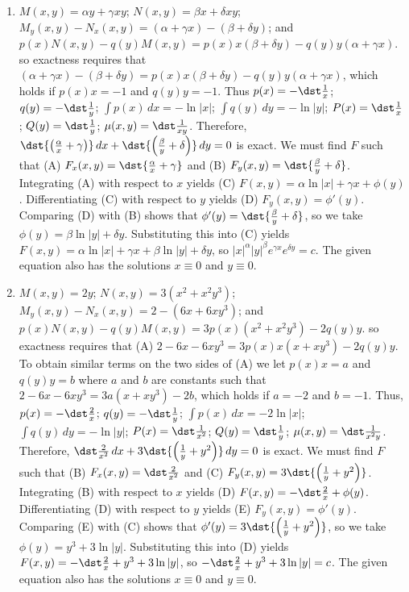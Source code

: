 \documentclass[openany]{book}
\newenvironment{sectionSolutions}{
 \begin{enumerate}[item-label={\thesection.\arabic{enumi}.}]
}{
 \end{enumerate}
}
\begin{document}
\begin{sectionSolutions}
\item
$M(x,y)=\alpha y+\gamma xy$;\;
$N(x,y)=\beta x+ \delta xy$;\;
 $M_y(x,y)-N_x(x,y)=(\alpha+\gamma x)-(\beta+\delta y)$;
and  $p(x)N(x,y)-q(y)M(x,y)=p(x)x(\beta + \delta y)-
q(y)y(\alpha +\gamma x)$.
so exactness requires that
 $(\alpha+\gamma x)-(\beta+\delta y)=
p(x)x(\beta+\delta y)-
q(y)y(\alpha+\gamma x)$,
which holds if
  $p(x)x=-1$ and $q(y)y=-1$. Thus
 $p(x)=-\dst\frac{1}{ x}$;\;
 $q(y)=-\dst\frac{1}{ y}$;\;
$\int p(x)\,dx=-\ln|x|$;\;
$\int q(y)\,dy=-\ln|y|$;\;
$P(x)=\dst\frac{1}{ x}$;
$Q(y)=\dst\frac{1}{ y}$;
$\mu(x,y)=\dst\frac{1}{ xy}$.
Therefore,
$\dst{\left(\frac{\alpha}{ x}+\gamma\right)}\,dx+
\dst{\left(\frac{\beta}{ y}+\delta\right)}\,dy=0$
is exact.
We must find $F$ such that
(A) $F_x(x,y)=\dst{\frac{\alpha}{ x}+\gamma}$ and
(B) $F_y(x,y)=\dst{\frac{\beta}{ y}+\delta}$.
Integrating (A) with respect to $x$ yields
(C) $F(x,y)=\alpha\ln|x|+\gamma x+\phi(y)$.
Differentiating (C) with respect to $y$  yields
(D) $F_y(x,y)=\phi'(y)$.
Comparing (D) with (B)  shows that
$\phi'(y)=\dst{\frac{\beta}{ y}+\delta}$, so we take
$\phi(y)=\beta\ln|y|+\delta y$.
Substituting this into (C) yields
$F(x,y)=\alpha\ln|x|+\gamma x+\beta\ln|y|+\delta y$,
so $|x|^\alpha|y|^\beta e^{\gamma x}e^{\delta y}=c$.
The given equation also has the solutions $x\equiv0$
and $y\equiv0$.



\item
$M(x,y)=2y$;\;
$N(x,y)=3(x^2+x^2y^3)$;\;
 $M_y(x,y)-N_x(x,y)=2-(6x+6xy^3)$;
and  $p(x)N(x,y)-q(y)M(x,y)=3p(x)(x^2+x^2y^3)-2q(y)y$.
so exactness requires that
(A) $2-6x-6xy^3=3p(x)x(x+xy^3)-2q(y)y$.
To obtain  similar terms on the two sides of (A)
we let  $p(x)x=a$ and $q(y)y=b$  where $a$ and $b$ are constants
such that $2-6x-6xy^3=3a(x+xy^3)-2b$, which  holds if
$a=-2$ and $b=-1$. Thus,
 $p(x)=-\dst\frac{2}{ x}$;\;
 $q(y)=-\dst\frac{1}{ y}$;\;
$\int p(x)\,dx=-2\ln|x|$;\;
$\int q(y)\,dy=-\ln|y|$;\;
$P(x)=\dst\frac{1}{ x^2}$;
$Q(y)=\dst\frac{1}{ y}$;
$\mu(x,y)=\dst\frac{1}{ x^2y}$.
Therefore,
$\dst\frac{2}{ x^2}\,dx+3\dst{\left(\frac{1}{ y}+y^2\right)}\,dy=0$
is exact.
We must find $F$ such that
(B) $F_x(x,y)=\dst\frac{2}{ x^2}$ and
(C) $F_y(x,y)=3\dst{\left(\frac{1}{ y}+y^2\right)}$.
Integrating (B) with respect to $x$ yields
(D) $F(x,y)=-\dst\frac{2}{ x}+\phi(y)$.
Differentiating (D) with respect to $y$  yields
(E) $F_y(x,y)=\phi'(y)$.
Comparing (E) with (C)  shows that
$\phi'(y)=3\dst{\left(\frac{1}{ y}+y^2\right)}$, so we take
$\phi(y)=y^3+3\ln|y|$.
Substituting this into (D) yields
$F(x,y)=-\dst\frac{2}{ x}+y^3+3\ln|y|$,
so $-\dst\frac{2}{ x}+y^3+3\ln|y|=c$.
The given equation also has the solutions $x\equiv0$
and $y\equiv0$.


\end{sectionSolutions}
\end{document}
